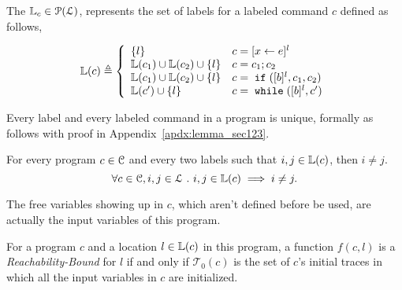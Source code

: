 The $\mathbb{L}_c \in \mathcal{P}(\mathcal{L})$,
represents the set of labels
for a labeled command $c$ defined as follows,
%
\begin{defn}
\label{def:lvar}
{\small
$$
  \lvar(c) \triangleq
  \left\{
  \begin{array}{ll}
      \{l\}                  
      & {c} = [{\assign x e}]^{l} 
      \\
      \lvar({c_1}) \cup \lvar({{c_2}})  \cup \{l\} 
      & {c} = {c_1};{c_2}
      \\
      \lvar(c_1) \cup \lvar({{c_2}}) \cup \{l\} 
      & {c} =\eif([\bexpr]^{l}, c_1, c_2) 
      \\
      \lvar({{c}'}) \cup \{l\} 
      & {c}   = \ewhile ([\bexpr]^{l}, {c}')
\end{array}
\right.
$$
}
\end{defn}
%
Every label and every labeled command in a program is unique, formally as follows with proof in Appendix~\ref{apdx:lemma_sec123}.
\begin{lem}
  \label{lem:label_unique}
  For every program $c \in \mathcal{C}$ and every two labels such that
  $i, j \in \mathbb{L}(c)$, then $i \neq j$.
  \[
    \forall c \in \mathcal{C}, i, j \in \mathcal{L} ~.~ i, j \in \mathbb{L}(c)\implies i \neq j.
    \]
\end{lem}
%
The free variables
showing up in $c$, which aren't defined before be used, are actually the input variables of this program.
%
\begin{defn}
  \label{def:rb}
  For a program ${c}$ and a location $l \in \mathbb{L}(c)$ in this program,
a function $f(c, l)$ is a \emph{Reachability-Bound} for $l$ if and only if
%
$\mathcal{T}_0(c)$ is the set of $c$'s initial traces in which all the input variables in
$c$ are initialized.
\end{defn}
